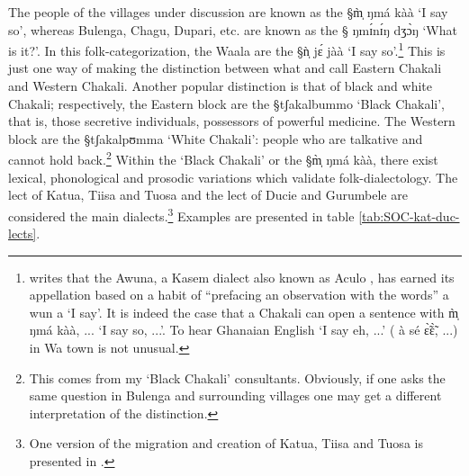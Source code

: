 The people of the villages under discussion are known as the  {\S m̩̀ ŋmá
kàà} `I say so', whereas Bulenga,  Chagu, Dupari, etc. are known as the  {\S
ŋmɪ́nɪ́ŋ dʒɔ̀ŋ} `What is it?'. In this folk-categorization, the Waala are the
{\S ǹ̩ jɛ́ jàà} `I say so'.\footnote{\citet[525]{Ratt32b} writes that the
Awuna,  a Kasem dialect also known as Aculo \cite[147]{Nade89},  has earned its 
appellation based on a habit of  ``prefacing an observation with the
words''  {\F a wun a} `I say'. It is indeed the case that a Chakali  can open a
sentence with {\F m̩̀ ŋmá
kàà, ...}  `I say so, ...'. To hear  Ghanaian English  `I say eh, ...'  ({\F
à sé ɛ̃̀ɛ̃̀, ...})    in Wa town is not unusual.} This is just one way of
making the distinction
between what \citet[2-3]{Good54} and \citet[37]{Sali08} call Eastern Chakali and
Western Chakali. Another popular distinction  is that of black and white
Chakali; respectively, the Eastern block are the {\S tʃakalbummo} `Black
Chakali', that is,  those secretive individuals, possessors of powerful
medicine. The Western block are  the   {\S tʃakalpʊmma}  `White Chakali': people
who are talkative and cannot hold back.\footnote{This comes from my `Black
Chakali' consultants. Obviously, if one asks the same question in Bulenga and
surrounding villages one may get a different interpretation of the
distinction.}   Within the `Black Chakali' or  the  {\S m̩̀ ŋmá kàà}, there
exist lexical, phonological and prosodic variations which validate
folk-dialectology. The lect of Katua, Tiisa and Tuosa  and the lect of
Ducie and Gurumbele are considered the main dialects.\footnote{One version of
the migration and creation of Katua, Tiisa and Tuosa is presented in
\citet[74-82]{Sali08}.}  Examples are presented in table
\ref{tab:SOC-kat-duc-lects}.

